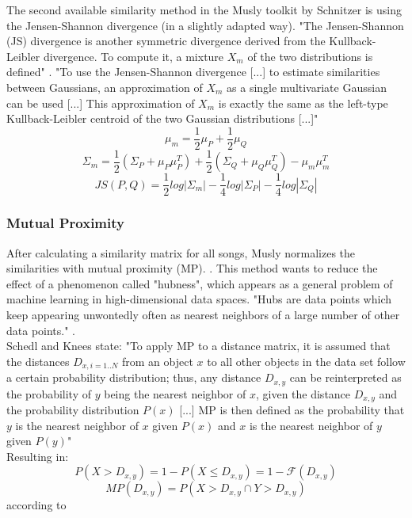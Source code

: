 The second available similarity method in the Musly toolkit by Schnitzer is using the Jensen-Shannon divergence (in a slightly adapted way). "The Jensen-Shannon (JS) divergence is another symmetric divergence derived from the Kullback-Leibler divergence. To compute it, a mixture $X_m$ of the two distributions is defined" \cite[p. 43]{schnitzer1}. "To use the Jensen-Shannon divergence [...] to estimate similarities between Gaussians, an approximation of $X_m$ as a single multivariate Gaussian can be used [...] This approximation of $X_m$ is exactly the same as the left-type Kullback-Leibler centroid of the two Gaussian distributions [...]" \cite[p. 45]{schnitzer1} 
\begin{equation} \label{eq:jsl1}
\mu_m = \frac{1}{2} \mu_P + \frac{1}{2} \mu_Q
\end{equation}
\begin{equation} \label{eq:jsl2}
\Sigma_m = \frac{1}{2} (\Sigma_P + \mu_P\mu_P^T) + \frac{1}{2} (\Sigma_Q + \mu_Q\mu_Q^T) - \mu_m\mu_m^T
\end{equation}
\begin{equation} \label{eq:jsl3}
JS(P, Q) = \frac{1}{2} log|\Sigma_m| - \frac{1}{4} log |\Sigma_P| - \frac{1}{4} log |\Sigma_Q|
\end{equation}

\subsubsection{Mutual Proximity}\label{mprox}
After calculating a similarity matrix for all songs, Musly normalizes the similarities with mutual proximity (MP). \cite{musly2}. This method wants to reduce the effect of a phenomenon called "hubness", which appears as a general problem of machine learning in high-dimensional data spaces. "Hubs are data points which keep appearing unwontedly often as nearest neighbors of a large number of other data points." \cite[p. 66]{schnitzer1}.\\
Schedl and Knees state: "To apply MP to a distance matrix, it is assumed that the distances $D_{x,i = 1..N}$ from an object $x$ to all other objects in the data set follow a certain probability distribution; thus, any distance $D_{x,y}$ can be reinterpreted as the probability of $y$ being the nearest neighbor of $x$, given the distance $D_{x,y}$ and the probability distribution $P(x)$ [...] MP is then defined as the probability that $y$ is the nearest neighbor of $x$ given $P(x)$ and $x$ is the nearest neighbor of $y$ given $P(y)$" \cite[p. 80]{knees1}\\
Resulting in: 
\begin{equation} \label{eq:mp1}
P(X > D_{x,y}) = 1 - P(X \leq D_{x,y}) = 1 - \mathscr{F}(D_{x,y}) 
\end{equation}
\begin{equation} \label{eq:mp2}
MP(D_{x,y}) = P(X > D_{x,y} \cap Y > D_{x,y})
\end{equation}
according to \cite[p. 80]{knees1}\\

